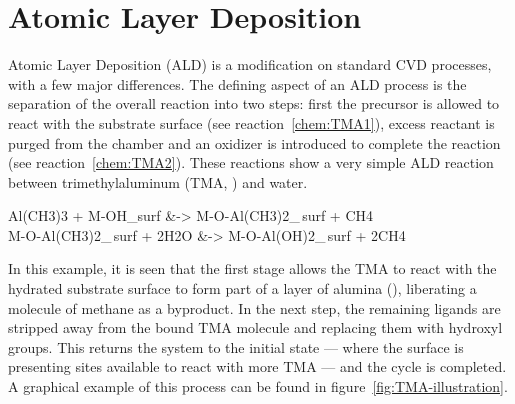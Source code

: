 \section{Atomic Layer Deposition}
	
Atomic Layer Deposition (ALD) is a modification on standard CVD processes, with a few major differences. The defining aspect of an ALD process is the separation of the overall reaction into two steps: first the precursor is allowed to react with the substrate surface (see reaction~\ref{chem:TMA1}), excess reactant is purged from the chamber and an oxidizer is introduced to complete the reaction (see reaction~\ref{chem:TMA2}). These reactions show a very simple ALD reaction between trimethylaluminum (TMA, ) and water. 

\begin{reactions}
	Al(CH3)3 + M-OH_{surf} &-> M-O-Al(CH3)2_{\,surf} + CH4 \label{chem:TMA1}%
		\\
	M-O-Al(CH3)2_{\,surf} + 2H2O &-> M-O-Al(OH)2_{\,surf} + 2CH4 \label{chem:TMA2}%
\end{reactions}


In this example, it is seen that the first stage allows the TMA to react with the hydrated substrate surface to form part of a layer of alumina (), liberating a molecule of methane as a byproduct. In the next step, the remaining ligands are stripped away from the bound TMA molecule and replacing them with hydroxyl groups. This returns the system to the initial state --- where the surface is presenting sites available to react with more TMA --- and the cycle is completed. A graphical example of this process can be found in figure~\ref{fig:TMA-illustration}.


